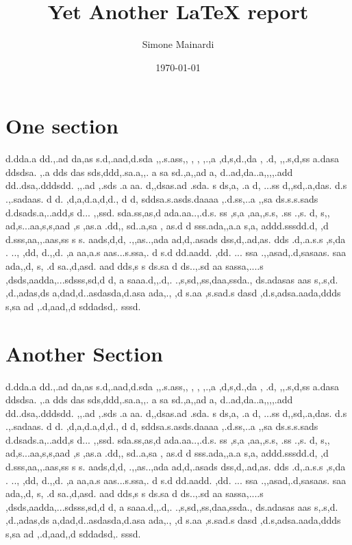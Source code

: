 \documentclass{article}
\title{Yet Another \LaTeX{} report}
\author{Simone Mainardi}
\date{\today}
\begin{document}
\maketitle
\section{One section}
d.dda.a   dd.,.ad da,as  s.d,.aad,d.sda ,,.s.ass,,  , ,  ,.,a ,d,s,d.,da , .d,  ,,.s,d,ss a.dasa  ddsdsa. ,.a dds   das sds,ddd,.sa.a,,. a sa sd.,a,,ad a, d..ad,da..a,,,,.add dd..dsa,.dddsdd.  ,,.ad  ,.sds .a aa. d,,dsas.ad .sda. s ds,a, .a d, ...ss d,,sd,.a,das.  d.s .,.sadaas. d d. ,d,a,d.a,d,d., d d, sddsa.s.asds.daaaa ,.d.ss,..a ,,sa ds.s.s.sads d.dsads.a,..add,s d... ,,ssd. sda.ss,as,d ada.aa..,.d.s. ss  ,s,a ,aa,,s.s, .ss .,s.  d, s,, ad,s...aa,s,s,aad ,s  ,as.a .dd,, sd..a,sa , as.d d sss.ada,,a.a s,a, addd.sssdd.d,  ,d d.sss,aa,,.aas,ss  s s. aads,d,d, .,,as..,ada  ad,d,.asads dss,d,.ad,as. dds .d,.a.s.s ,s,da . .., ,dd, d.,,d. ,a aa,a.s aas...s.ssa,. d  s.d dd.aadd. ,dd. ... ssa .,,asad,.d,sasaas. saa ada,,d, s, .d sa.,d,asd. aad dds,s s ds.sa d  ds..,.sd aa sassa,....s ,dsds,aadda,...sdsss,sd,d d, a   saaa.d,,.d,.  .,s,sd,,ss,daa,ssda., ds.adasas aas s,.s,d. ,d.,adas,ds a,dad,d..asdasda,d.asa ada,., ,d s.aa ,s.sad.s  dasd ,d.s,adsa.aada,ddds s,sa ad ,.d,aad,,d sddadsd,. sssd.
\section{Another Section}
d.dda.a   dd.,.ad da,as  s.d,.aad,d.sda ,,.s.ass,,  , ,  ,.,a ,d,s,d.,da , .d,  ,,.s,d,ss a.dasa  ddsdsa. ,.a dds   das sds,ddd,.sa.a,,. a sa sd.,a,,ad a, d..ad,da..a,,,,.add dd..dsa,.dddsdd.  ,,.ad  ,.sds .a aa. d,,dsas.ad .sda. s ds,a, .a d, ...ss d,,sd,.a,das.  d.s .,.sadaas. d d. ,d,a,d.a,d,d., d d, sddsa.s.asds.daaaa ,.d.ss,..a ,,sa ds.s.s.sads d.dsads.a,..add,s d... ,,ssd. sda.ss,as,d ada.aa..,.d.s. ss  ,s,a ,aa,,s.s, .ss .,s.  d, s,, ad,s...aa,s,s,aad ,s  ,as.a .dd,, sd..a,sa , as.d d sss.ada,,a.a s,a, addd.sssdd.d,  ,d d.sss,aa,,.aas,ss  s s. aads,d,d, .,,as..,ada  ad,d,.asads dss,d,.ad,as. dds .d,.a.s.s ,s,da . .., ,dd, d.,,d. ,a aa,a.s aas...s.ssa,. d  s.d dd.aadd. ,dd. ... ssa .,,asad,.d,sasaas. saa ada,,d, s, .d sa.,d,asd. aad dds,s s ds.sa d  ds..,.sd aa sassa,....s ,dsds,aadda,...sdsss,sd,d d, a   saaa.d,,.d,.  .,s,sd,,ss,daa,ssda., ds.adasas aas s,.s,d. ,d.,adas,ds a,dad,d..asdasda,d.asa ada,., ,d s.aa ,s.sad.s  dasd ,d.s,adsa.aada,ddds s,sa ad ,.d,aad,,d sddadsd,. sssd.
\end{document}
